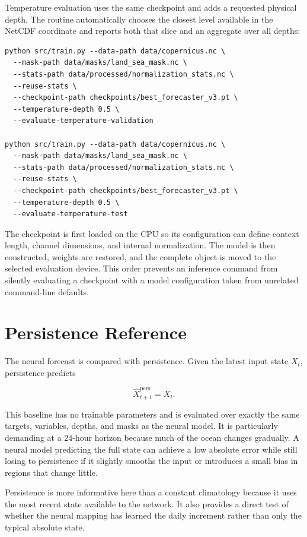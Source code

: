 Temperature evaluation uses the same checkpoint and adds a requested physical depth. The routine automatically chooses the closest level available in the NetCDF coordinate and reports both that slice and an aggregate over all depths:

\begin{lstlisting}[caption={Physical-unit temperature evaluation.}]
python src/train.py --data-path data/copernicus.nc \
  --mask-path data/masks/land_sea_mask.nc \
  --stats-path data/processed/normalization_stats.nc \
  --reuse-stats \
  --checkpoint-path checkpoints/best_forecaster_v3.pt \
  --temperature-depth 0.5 \
  --evaluate-temperature-validation

python src/train.py --data-path data/copernicus.nc \
  --mask-path data/masks/land_sea_mask.nc \
  --stats-path data/processed/normalization_stats.nc \
  --reuse-stats \
  --checkpoint-path checkpoints/best_forecaster_v3.pt \
  --temperature-depth 0.5 \
  --evaluate-temperature-test
\end{lstlisting}

The checkpoint is first loaded on the CPU so its configuration can define context length, channel dimensions, and internal normalization. The model is then constructed, weights are restored, and the complete object is moved to the selected evaluation device. This order prevents an inference command from silently evaluating a checkpoint with a model configuration taken from unrelated command-line defaults.

\section{Persistence Reference}

The neural forecast is compared with persistence. Given the latest input state $X_t$, persistence predicts

\[
\widehat{X}^{\mathrm{pers}}_{t+1}=X_t.
\]

This baseline has no trainable parameters and is evaluated over exactly the same targets, variables, depths, and masks as the neural model. It is particularly demanding at a 24-hour horizon because much of the ocean changes gradually. A neural model predicting the full state can achieve a low absolute error while still losing to persistence if it slightly smooths the input or introduces a small bias in regions that change little.

Persistence is more informative here than a constant climatology because it uses the most recent state available to the network. It also provides a direct test of whether the neural mapping has learned the daily increment rather than only the typical absolute state.

